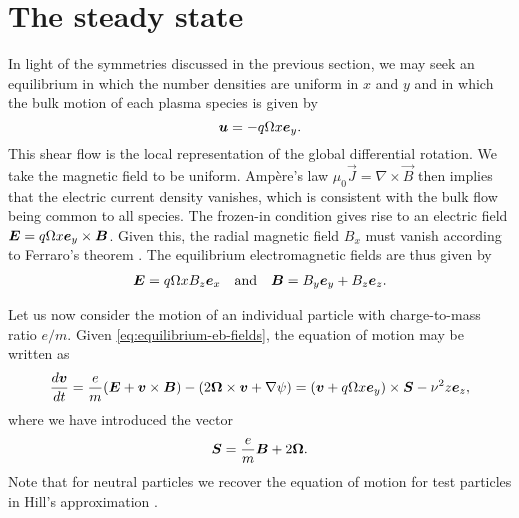 \documentclass[aps,pre,notitlepage,amsmath,amssymb,amsfonts,nobibnotes,nofootinbib]{revtex4-1}
\begin{document}
\section{The steady state}
\label{sec:steady-state}

In light of the symmetries discussed in the previous section, we may seek an
equilibrium in which the number densities are uniform in $x$ and $y$ and in
which the bulk motion of each plasma species is given by
\begin{equation}
  \label{eq:shear-flow}
  \vec{u} = -q\Omega x\ey.
\end{equation}
This shear flow is the local representation of the global differential
rotation. We take the magnetic field to be uniform. Ampère's law
$\mu_0\vec{J}=\nabla\times\vec{B}$ then implies that the electric current
density vanishes, which is consistent with the bulk flow
 being common to all species. The frozen-in condition
gives rise to an electric field $\bm{E}=q\Omega{}x\bm{e}_y\times\bm{B}$. Given
this, the radial magnetic field $B_x$ must vanish according to Ferraro's
theorem \citep{Ferraro1937}. The equilibrium electromagnetic fields are thus
given by
\begin{align}
  \label{eq:equilibrium-eb-fields}
  \vec{E} = q\Omega xB_z\ex
  \quad\textrm{and}\quad
  \vec{B} = B_y\ey + B_z\ez.
\end{align}

Let us now consider the motion of an individual particle with charge-to-mass
ratio $e/m$. Given \cref{eq:equilibrium-eb-fields}, the equation of motion may
be written as
\begin{equation}
  \label{eq:particle-eom}
  \der{\vec{v}}{t} =
  \cm(\vec{E} + \vec{v}\times\vec{B})
  - (2\vec{\Omega}\times\vec{v} + \nabla\psi) =
  (\vec{v} + q\Omega x\ey)\times\vec{S} - \vfreq^2 z\ez,
\end{equation}
where we have introduced the vector
\begin{equation}
  \label{eq:spin}
  \vec{S} = \cm\vec{B} + 2\vec{\Omega}.
\end{equation}
Note that for neutral particles we recover the equation of motion for test
particles in Hill's approximation \citep{Hill1878}.
\end{document}
